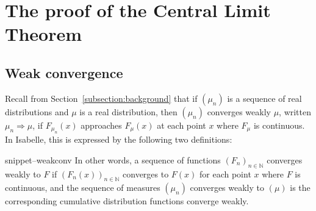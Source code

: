 \documentclass{svjour3}
\newcommand{\NN}{\mathbb{N}}
\newcommand{\Snippet}[1]{\csname snippet--#1\endcsname}
\begin{document}
\section{The proof of the Central Limit Theorem}
\label{section:formal}

\subsection{Weak convergence}
\label{subsection:weak:convergence}

Recall from Section~\ref{subsection:background} that if $(\mu_n)$ is a sequence of real distributions and $\mu$ is a real distribution, then $(\mu_n)$ converges weakly $\mu$, written $\mu_n \Rightarrow \mu$, if $F_{\mu_n}(x)$ approaches $F_\mu(x)$ at each point $x$ where $F_\mu$ is continuous. In Isabelle, this is expressed by the following two definitions:

\Snippet{weakconv}
In other words, a sequence of functions $(F_n)_{n \in \NN}$ converges weakly to $F$ if $(F_n(x))_{n \in \NN}$ converges to $F(x)$ for each point $x$ where $F$ is continuous, and the sequence of measures $(\mu_n)$ converges weakly to $(\mu)$ is the corresponding cumulative distribution functions converge weakly.
\end{document}
